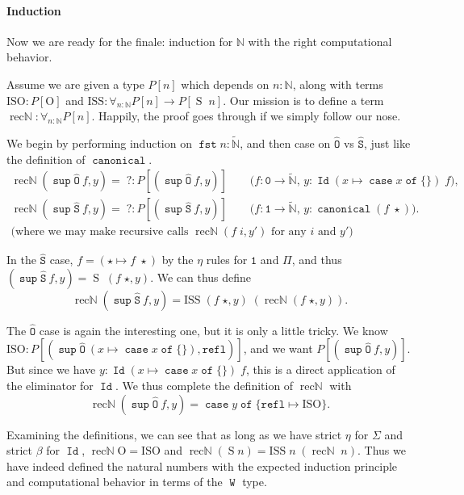 \documentclass[a4paper,UKenglish,cleveref,nameinlink,autoref,thm-restate]{lipics-v2019}
\newcommand{\zero}{\mathtt{0}}
\newcommand{\one}{\mathtt{1}}
\newcommand{\codeO}{\mathtt{\hat{O}}}
\newcommand{\codeS}{\mathtt{\hat{S}}}
\DeclareMathOperator{\supop}{\mathtt{sup}}
\renewcommand{\sup}[2]{\supop {#1}\:\!{#2}}
\newcommand{\N}{\hyperref[define-N]{\mathbb{N}}}
\newcommand{\preN}{\hyperref[define-preN]{\tilde{\mathbb{N}}}}
\DeclareMathOperator{\case}{\mathtt{case}}
\newcommand{\caset}[2]{\case {#1}\;\mathtt{of}\;\{{#2}\}}
\DeclareMathOperator{\W}{\mathtt{W}}
\DeclareMathOperator{\Idop}{\mathtt{Id}}
\newcommand{\Id}[2]{\Idop {#1}\;{#2}}
\newcommand{\refl}{\mathtt{refl}}
\DeclareMathOperator{\fst}{\mathtt{fst}}
\DeclareMathOperator{\canonical}{\hyperref[define-canonical]{\mathtt{canonical}}}
\newcommand{\ISO}{\hyperref[define-ISO]{\mathrm{ISO}}}
\newcommand{\ISS}{\hyperref[define-ISS]{\mathrm{ISS}}}
\newcommand{\zerO}{\hyperref[define-O]{\mathrm{O}}}
\DeclareMathOperator{\Succ}{\hyperref[define-S]{S}}
\DeclareMathOperator{\recN}{\hyperref[define-recN]{\mathrm{rec\mathbb{N}}}}
\begin{document}
\paragraph*{Induction}

Now we are ready for the finale: induction for $\N$ with the right computational behavior.

Assume we are given a type $P[n]$ which depends on $n : \N$, along with terms $\ISO : P[\zerO]$ and $\ISS : \forall_{n : \N}P[n] \to P[\Succ\;n]$. Our mission is to define a term $\recN : \forall_{n : \N}P[n]$. Happily, the proof goes through if we simply follow our nose.

We begin by performing induction on $\fst n : \preN$, and then case on $\codeO$ vs $\codeS$, just like the definition of $\canonical$.
\begin{gather*}
\recN (\sup{\codeO}{f},y) =\; ? : P[(\sup{\codeO}{f},y)]\qquad\text{($f : \zero \to \preN$, $y : \Id{(x\mapsto\caset{x}{})}{f}$)},\\
\recN (\sup{\codeS}{f},y) =\; ? : P[(\sup{\codeS}{f},y)]\qquad\text{($f : \one \to \preN$, $y : \canonical(f\;\star)$)}.\\
\text{(where we may make recursive calls $\recN(f\; i, y')$ for any $i$ and $y'$)}
\end{gather*}

In the $\codeS$ case, $f = (\star \mapsto f\; \star)$ by the $\eta$ rules for $\one$ and $\Pi$, and thus $(\sup{\codeS}{f}, y) = \Succ\;(f\; \star, y)$. We can thus define
\begin{equation*}\recN (\sup{\codeS}{f},y) = \ISS\;(f\;\star, y)\;(\recN(f\;\star, y)).\end{equation*}

The $\codeO$ case is again the interesting one, but it is only a little tricky. We know $\ISO : P[ (\sup{\codeO}{(x\mapsto\caset{x}{})},\refl)]$, and we want $P[(\sup{\codeO}{f},y)]$. But since we have $y : \Id{(x\mapsto\caset{x}{})}{f}$, this is a direct application of the eliminator for $\Idop$.
We thus complete the definition of $\recN$ with
\begin{equation*}\recN (\sup{\codeO}{f},y) = \caset{y}{\refl \mapsto \ISO}.\end{equation*}

Examining the definitions, we can see that as long as we have strict $\eta$ for $\Sigma$ and strict $\beta$ for $\Idop$, $\recN \zerO = \ISO$ and $\recN(\Succ n) = \ISS\;n\;(\recN\;n)$. Thus we have indeed defined the natural numbers with the expected induction principle and computational behavior in terms of the $\W$ type.
\end{document}
